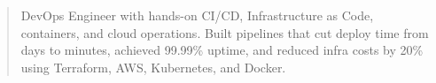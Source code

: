 \begin{quote}
DevOps Engineer with hands-on CI/CD, Infrastructure as Code, containers, and cloud operations. Built pipelines that cut deploy time from days to minutes, achieved 99.99\% uptime, and reduced infra costs by 20\% using Terraform, AWS, Kubernetes, and Docker.
\end{quote}
\divider
{}

\par{}
  \\
  \\
  
\divider\smallskip
{}  \\
  
\par

